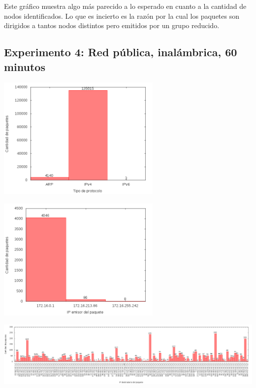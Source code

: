 Este gráfico muestra algo más parecido a lo esperado en cuanto a la cantidad de nodos identificados. Lo que es incierto es la razón por la cual
los paquetes son dirigidos a tantos nodos distintos pero emitidos por un grupo reducido.

\subsection{Experimento 4: Red pública, inalámbrica, 60 minutos}

\begin{center}
\includegraphics[width=8cm]{../mediciones/altop-wifi-60/altop60Protocolos.png}
\end{center}

\begin{center}
\includegraphics[width=8cm]{../mediciones/altop-wifi-60/altop60IpsSrcArp.png}
\end{center}

\begin{center}
\includegraphics[width=16cm]{../mediciones/altop-wifi-60/altop60IpsDstArp.png}
\end{center}

